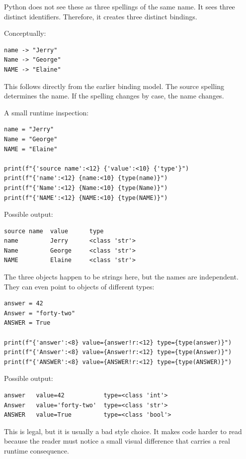 Python does not see these as three spellings of the same name. It sees three distinct identifiers. Therefore, it creates three distinct bindings.

Conceptually:

\begin{verbatim}
name -> "Jerry"
Name -> "George"
NAME -> "Elaine"
\end{verbatim}

This follows directly from the earlier binding model. The source spelling determines the name. If the spelling changes by case, the name changes.

A small runtime inspection:

\begin{verbatim}
name = "Jerry"
Name = "George"
NAME = "Elaine"

print(f"{'source name':<12} {'value':<10} {'type'}")
print(f"{'name':<12} {name:<10} {type(name)}")
print(f"{'Name':<12} {Name:<10} {type(Name)}")
print(f"{'NAME':<12} {NAME:<10} {type(NAME)}")
\end{verbatim}

Possible output:

\begin{verbatim}
source name  value      type
name         Jerry      <class 'str'>
Name         George     <class 'str'>
NAME         Elaine     <class 'str'>
\end{verbatim}

The three objects happen to be strings here, but the names are independent. They can even point to objects of different types:

\begin{verbatim}
answer = 42
Answer = "forty-two"
ANSWER = True

print(f"{'answer':<8} value={answer!r:<12} type={type(answer)}")
print(f"{'Answer':<8} value={Answer!r:<12} type={type(Answer)}")
print(f"{'ANSWER':<8} value={ANSWER!r:<12} type={type(ANSWER)}")
\end{verbatim}

Possible output:

\begin{verbatim}
answer   value=42           type=<class 'int'>
Answer   value='forty-two'  type=<class 'str'>
ANSWER   value=True         type=<class 'bool'>
\end{verbatim}

This is legal, but it is usually a bad style choice. It makes code harder to read because the reader must notice a small visual difference that carries a real runtime consequence.

